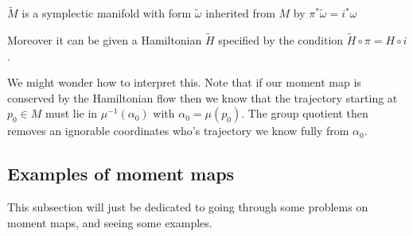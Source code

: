 \documentclass{article}
\begin{document}
$\tilde{M}$ is a symplectic manifold with form $\tilde{\omega}$ inherited from $M$ by $\pi^\ast \tilde{\omega} = i^\ast \omega$
\begin{center}
\end{center}
Moreover it can be given a Hamiltonian $\tilde{H}$ specified by the condition $\tilde{H}\circ \pi = H \circ i $.
\begin{idea}
We might wonder how to interpret this. Note that if our moment map is conserved by the Hamiltonian flow then we know that the trajectory starting at $p_0 \in M$ must lie in $\mu^{-1}(\alpha_0)$ with $\alpha_0 = \mu(p_0)$. The group quotient then removes an ignorable coordinates who's trajectory we know fully from $\alpha_0$.  
\end{idea}

\subsection{Examples of moment maps}
This subsection will just be dedicated to going through some problems on moment maps, and seeing some examples. 
\end{document}

